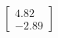\documentclass[preview]{standalone}
\begin{document}
\begin{align*}
\begin{bmatrix} 4.82 \\ -2.89 \end{bmatrix}
\end{align*}
\end{document}
